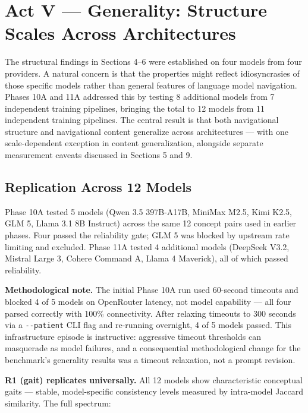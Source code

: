 \section{Act V --- Generality: Structure Scales Across Architectures}\label{act-v-generality-structure-scales-across-architectures}

The structural findings in Sections 4--6 were established on four models from four providers. A natural concern is that the properties might reflect idiosyncrasies of those specific models rather than general features of language model navigation. Phases 10A and 11A addressed this by testing 8 additional models from 7 independent training pipelines, bringing the total to 12 models from 11 independent training pipelines. The central result is that both navigational structure and navigational content generalize across architectures --- with one scale-dependent exception in content generalization, alongside separate measurement caveats discussed in Sections 5 and 9.

\subsection{Replication Across 12 Models}\label{replication-across-12-models}

Phase 10A tested 5 models (Qwen 3.5 397B-A17B, MiniMax M2.5, Kimi K2.5, GLM 5, Llama 3.1 8B Instruct) across the same 12 concept pairs used in earlier phases. Four passed the reliability gate; GLM 5 was blocked by upstream rate limiting and excluded. Phase 11A tested 4 additional models (DeepSeek V3.2, Mistral Large 3, Cohere Command A, Llama 4 Maverick), all of which passed reliability.

\textbf{Methodological note.} The initial Phase 10A run used 60-second timeouts and blocked 4 of 5 models on OpenRouter latency, not model capability --- all four parsed correctly with 100\% connectivity. After relaxing timeouts to 300 seconds via a \texttt{-\/-patient} CLI flag and re-running overnight, 4 of 5 models passed. This infrastructure episode is instructive: aggressive timeout thresholds can masquerade as model failures, and a consequential methodological change for the benchmark's generality results was a timeout relaxation, not a prompt revision.

\textbf{R1 (gait) replicates universally.} All 12 models show characteristic conceptual gaits --- stable, model-specific consistency levels measured by intra-model Jaccard similarity. The full spectrum:

